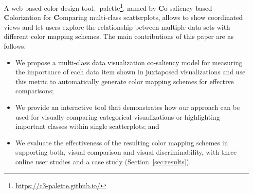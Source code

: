 A web-based color design tool, \toolname-palette\footnote{\small \url{https://c3-palette.github.io/}}, named by \textbf{C}o-saliency based \textbf{C}olorization for \textbf{C}omparing multi-class scatterplots, allows to show coordinated views and let users  explore the relationship between multiple data sets with different color mapping schemes. 
The main contributions of this paper are as follows:
\begin{itemize}[noitemsep]
\setlength{\itemsep}{5pt}
  \item We propose a multi-class data visualization co-saliency model for measuring the importance of each data item shown in juxtaposed visualizations and use this metric to automatically generate color mapping schemes for effective comparisons;
    \item
  We provide an interactive tool that demonstrates how our approach can be used for visually comparing categorical visualizations or highlighting important classes within single scatterplots; and
  \item
   We evaluate the effectiveness of the resulting color mapping schemes in supporting both, visual comparison and visual discriminability, with three online user studies and a case study (Section~\ref{sec:results}).

\end{itemize}

